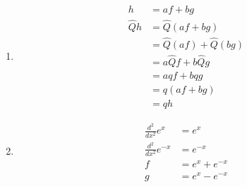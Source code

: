 \documentclass{article}
\begin{document}
\subsection{}

\begin{enumerate}
  \item

        \begin{align*}
          h         & = a f + b g                     \\
          \hat{Q} h & = \hat{Q} (a f + b g)           \\
                    & = \hat{Q} (a f) + \hat{Q} (b g) \\
                    & = a \hat{Q} f + b \hat{Q} g     \\
                    & = a q f + b q g                 \\
                    & = q (a f + b g)                 \\
                    & = q h
        \end{align*}

  \item

        \begin{align*}
          \frac{d^2}{d x^2} e^x    & = e^x          \\
          \frac{d^2}{d x^2} e^{-x} & = e^{-x}       \\
          f                        & = e^x + e^{-x} \\
          g                        & = e^x - e^{-x}
        \end{align*}
\end{enumerate}

\subsection{}
\end{document}
